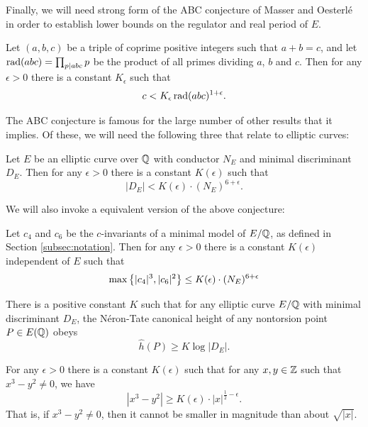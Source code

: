 \documentclass[10pt]{article}
\begin{document}
Finally, we will need strong form of the ABC conjecture of Masser and Oesterl\'{e} in order to establish lower bounds on the regulator and real period of $E$.
\begin{conjecture} \label{conj:ABC}
Let $(a,b,c)$ be a triple of coprime positive integers such that $a+b = c$, and let $\operatorname{rad}(abc) = \prod_{p | abc} p$ be the product of all primes dividing $a$, $b$ and $c$. Then for any $\epsilon > 0$ there is a constant $K_{\epsilon}$ such that
\begin{equation}
c < K_{\epsilon}\operatorname{rad}(abc)^{1+\epsilon}.
\end{equation}
\end{conjecture}
The ABC conjecture is famous for the large number of other results that it implies. Of these, we will need the following three that relate to elliptic curves:

\begin{conjecture}[Szpiro]\label{conj:Szpiro}
Let $E$ be an elliptic curve over $\mathbb{Q}$ with conductor $N_E$ and minimal discriminant $D_E$. Then for any $\epsilon > 0$ there is a constant $K(\epsilon)$ such that
\begin{equation}
|D_E| < K(\epsilon)\cdot (N_E)^{6+\epsilon}.
\end{equation}
\end{conjecture}

We will also invoke a equivalent version of the above conjecture:
\begin{conjecture}\label{conj:modified_szpiro}
Let $c_4$ and $c_6$ be the $c$-invariants of a minimal model of $E/\mathbb{Q}$, as defined in Section \ref{subsec:notation}. Then for any $\epsilon>0$ there is a constant $K(\epsilon)$ independent of $E$ such that
\begin{equation}
\max\left\{|c_4|^3,|c_6|^2\right\} \le K(\epsilon)\cdot (N_E)^{6+\epsilon}
\end{equation}
\end{conjecture}

\begin{conjecture}[Lang]\label{conj:Lang}
There is a positive constant $K$ such that for any elliptic curve $E/\mathbb{Q}$ with minimal discriminant $D_E$, the N\'{e}ron-Tate canonical height of any nontorsion point $P\in E(\mathbb{Q})$ obeys
\begin{equation}
\hat{h}(P) \ge K\log |D_E|.
\end{equation}
\end{conjecture}

\begin{conjecture}[Hall]\label{conj:Hall}
For any $\epsilon > 0$ there is a constant $K(\epsilon)$ such that for any $x,y \in \mathbb{Z}$ such that $x^3-y^2 \ne 0$, we have
\begin{equation}
|x^3-y^2| \ge K(\epsilon)\cdot |x|^{\frac{1}{2}-\epsilon}.
\end{equation}
That is, if $x^3-y^2 \ne 0$, then it cannot be smaller in magnitude than about $\sqrt{|x|}$.
\end{conjecture}
\end{document}
